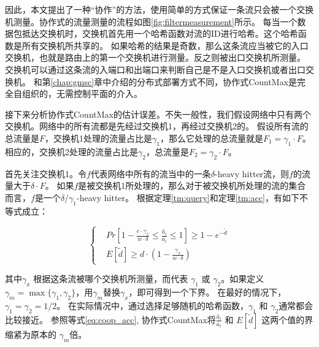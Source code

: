 因此，本文提出了一种“协作”的方法，使用简单的方式保证一条流只会被一个交换机测量。协作式的流量测量的流程如图\ref{fig:filtermeasurement}所示。
每当一个数据包抵达交换机时，交换机首先用一个哈希函数对流的ID进行哈希。这个哈希函数是所有交换机所共享的。
如果哈希的结果是奇数，那么这条流应当被它的入口交换机，也就是路由上的第一个交换机进行测量。反之则被出口交换机所测量。
交换机可以通过这条流的入端口和出端口来判断自己是不是入口交换机或者出口交换机。
和第\ref{chap:gmsc}章中介绍的分布式部署方式不同，协作式CountMax是完全自组织的，无需控制平面的介入。

接下来分析协作式CountMax的估计误差。不失一般性，我们假设网络中只有两个交换机。网络中的所有流都是先经过交换机1，再经过交换机2的。
假设所有流的总流量是$F$，交换机1处理的流量占比是$\gamma_1 $，那么它处理的总流量就是$F_1 =\gamma_1\cdot F $。
相应的，交换机2处理的流量占比是$\gamma_2 $，总流量是$F_2 =\gamma_2\cdot F $。

首先关注交换机1。令$f$代表网络中所有的流当中的一条$\delta$-heavy hitter流，则$f$的流量大于$\delta \cdot F$。
如果$f$是被交换机1所处理的，那么对于被交换机所处理的流的集合而言，$f$是一个$\delta/\gamma_1$-heavy hitter。
根据定理\ref{tm:query}和定理\ref{tm:acc}，有如下不等式成立：

\begin{equation}\label{eq:coop_acc}
\left\{
\begin{aligned}
&Pr[1-\frac{e\cdot \gamma_x}{w\cdot \delta}\le \frac{\hat{a}_i}{a_i} \le 1] \ge 1-e^{-\tilde{d}}\\
&E[\tilde{d}]\ge d\cdot(1-\frac{\gamma_x}{w\cdot\delta})
\end{aligned}
\right.
\end{equation}

其中$\gamma_x$ 根据这条流被哪个交换机所测量，而代表 $\gamma_1$ 或 $\gamma_2$。如果定义 $\gamma_m = \max \{\gamma_1, \gamma_2\}$，用$\gamma_m$替换$\gamma_x$，即可得到一个下界。
在最好的情况下，$\gamma_1=\gamma_2=1/2$。
在实际情况中，通过选择足够随机的哈希函数，$\gamma_1$ 和 $\gamma_2$通常都会比较接近。
参照等式\eqref{eq:coop_acc}, 协作式CountMax将$\frac{\hat{a}_i}{a_i}$ 和 $E[\tilde{d}]$ 这两个值的界缩紧为原本的 $\gamma_m $倍。
